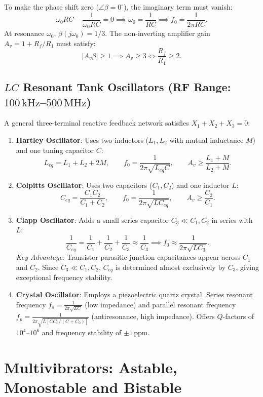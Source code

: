 \documentclass[12pt,a4paper]{article}
\begin{document}
\begin{tcolorbox}[formulabox, title={Wien Bridge Oscillation Frequency and Gain Condition}]
To make the phase shift zero ($\angle \beta = 0^\circ$), the imaginary term must vanish:
\[
\omega_0 RC - \frac{1}{\omega_0 RC} = 0 \implies \omega_0 = \frac{1}{RC} \implies f_0 = \frac{1}{2\pi RC}.
\]
At resonance $\omega_0$, $\beta(j\omega_0) = 1/3$. The non-inverting amplifier gain $A_v = 1 + R_f/R_1$ must satisfy:
\[
|A_v \beta| \ge 1 \implies A_v \ge 3 \iff \frac{R_f}{R_1} \ge 2.
\]
\end{tcolorbox}

\subsection{$LC$ Resonant Tank Oscillators (RF Range: $100\,\mathrm{kHz}$--$500\,\mathrm{MHz}$)}
A general three-terminal reactive feedback network satisfies $X_1 + X_2 + X_3 = 0$:
\begin{enumerate}[leftmargin=1.5em, itemsep=3pt]
  \item \textbf{Hartley Oscillator}: Uses two inductors ($L_1, L_2$ with mutual inductance $M$) and one tuning capacitor $C$:
  \[
  L_{eq} = L_1 + L_2 + 2M,\qquad
  f_0 = \frac{1}{2\pi \sqrt{L_{eq} C}},\qquad
  A_v \ge \frac{L_1 + M}{L_2 + M}.
  \]
  \item \textbf{Colpitts Oscillator}: Uses two capacitors ($C_1, C_2$) and one inductor $L$:
  \[
  C_{eq} = \frac{C_1 C_2}{C_1 + C_2},\qquad
  f_0 = \frac{1}{2\pi \sqrt{L C_{eq}}},\qquad
  A_v \ge \frac{C_2}{C_1}.
  \]
  \item \textbf{Clapp Oscillator}: Adds a small series capacitor $C_3 \ll C_1, C_2$ in series with $L$:
  \[
  \frac{1}{C_{eq}} = \frac{1}{C_1} + \frac{1}{C_2} + \frac{1}{C_3} \approx \frac{1}{C_3} \implies f_0 \approx \frac{1}{2\pi \sqrt{L C_3}}.
  \]
  \textit{Key Advantage}: Transistor parasitic junction capacitances appear across $C_1$ and $C_2$. Since $C_3 \ll C_1, C_2$, $C_{eq}$ is determined almost exclusively by $C_3$, giving exceptional frequency stability.
  \item \textbf{Crystal Oscillator}: Employs a piezoelectric quartz crystal. Series resonant frequency $f_s = \frac{1}{2\pi\sqrt{L C}}$ (low impedance) and parallel resonant frequency $f_p = \frac{1}{2\pi\sqrt{L [C C_0/(C+C_0)]}}$ (antiresonance, high impedance). Offers $Q$-factors of $10^4$--$10^6$ and frequency stability of $\pm 1\,\mathrm{ppm}$.
\end{enumerate}

\section{Multivibrators: Astable, Monostable and Bistable}
\end{document}
